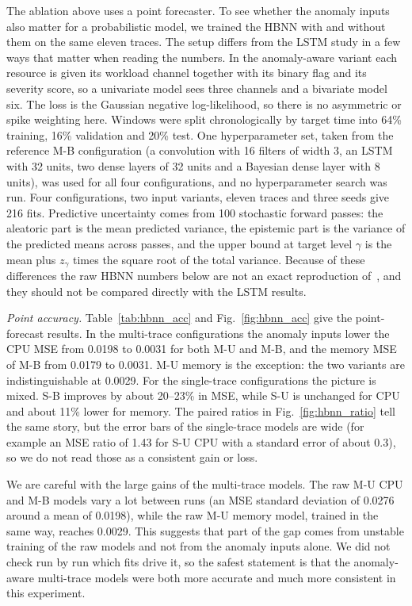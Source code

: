 \documentclass[conference]{IEEEtran}
\begin{document}
The ablation above uses a point forecaster. To see whether the anomaly inputs also matter for a probabilistic model, we trained the HBNN with and without them on the same eleven traces. The setup differs from the LSTM study in a few ways that matter when reading the numbers. In the anomaly-aware variant each resource is given its workload channel together with its binary flag and its severity score, so a univariate model sees three channels and a bivariate model six. The loss is the Gaussian negative log-likelihood, so there is no asymmetric or spike weighting here. Windows were split chronologically by target time into 64\% training, 16\% validation and 20\% test. One hyperparameter set, taken from the reference M-B configuration (a convolution with 16 filters of width 3, an LSTM with 32 units, two dense layers of 32 units and a Bayesian dense layer with 8 units), was used for all four configurations, and no hyperparameter search was run. Four configurations, two input variants, eleven traces and three seeds give 216 fits. Predictive uncertainty comes from 100 stochastic forward passes: the aleatoric part is the mean predicted variance, the epistemic part is the variance of the predicted means across passes, and the upper bound at target level $\gamma$ is the mean plus $z_\gamma$ times the square root of the total variance. Because of these differences the raw HBNN numbers below are not an exact reproduction of~\cite{rossi2025}, and they should not be compared directly with the LSTM results.

\textit{Point accuracy.}
Table~\ref{tab:hbnn_acc} and Fig.~\ref{fig:hbnn_acc} give the point-forecast results. In the multi-trace configurations the anomaly inputs lower the CPU MSE from 0.0198 to 0.0031 for both M-U and M-B, and the memory MSE of M-B from 0.0179 to 0.0031. M-U memory is the exception: the two variants are indistinguishable at 0.0029. For the single-trace configurations the picture is mixed. S-B improves by about 20--23\% in MSE, while S-U is unchanged for CPU and about 11\% lower for memory. The paired ratios in Fig.~\ref{fig:hbnn_ratio} tell the same story, but the error bars of the single-trace models are wide (for example an MSE ratio of 1.43 for S-U CPU with a standard error of about 0.3), so we do not read those as a consistent gain or loss.

We are careful with the large gains of the multi-trace models. The raw M-U CPU and M-B models vary a lot between runs (an MSE standard deviation of 0.0276 around a mean of 0.0198), while the raw M-U memory model, trained in the same way, reaches 0.0029. This suggests that part of the gap comes from unstable training of the raw models and not from the anomaly inputs alone. We did not check run by run which fits drive it, so the safest statement is that the anomaly-aware multi-trace models were both more accurate and much more consistent in this experiment.
\end{document}
